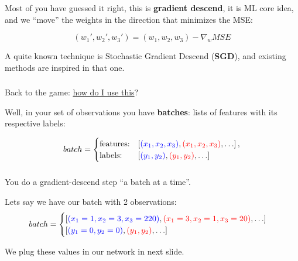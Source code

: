 \documentclass{beamer}
\begin{document}
\begin{frame}
    \frametitle{\insertsection}
    \framesubtitle{\insertsubsection}

    Most of you have guessed it right, this is \textbf{gradient descend}, it is ML core idea, and we ``move'' the weights in the direction that minimizes the MSE:

    \begin{equation}
        (w_1',w_2',w_3') = (w_1,w_2,w_3) - \nabla_w MSE
    \end{equation}

    \vfill
    A quite known technique is Stochastic Gradient Descend (\textbf{SGD}), and existing methods are inspired in that one.
\end{frame}



\begin{frame}
    \frametitle{\insertsection}
    \framesubtitle{\insertsubsection}

    Back to the game: \underline{how do I use this}?
    \vfill

    Well, in your set of observations you have \textbf{batches}: lists of features with its respective labels:

    \begin{equation*}
        batch=\begin{cases}
            \text{features:} & \left[ {\color{blue}(x_1,x_2,x_3)}, {\color{red}(x_1,x_2,x_3)},\ldots \right],\\
            \text{labels:} & \left[ {\color{blue}(y_1,y_2)}, {\color{red}(y_1,y_2)},\ldots \right]
        \end{cases}
    \end{equation*}
\end{frame}


\begin{frame}
    \frametitle{\insertsection}
    \framesubtitle{\insertsubsection}

    You do a gradient-descend step ``a batch at a time''.

    Lets say we have our batch with 2 observations:
    \begin{equation*}
        batch=\begin{cases}
            \left[ {\color{blue}(x_1=1,x_2=3,x_3=220)}, {\color{red}(x_1=3,x_2=1,x_3=20)},\ldots \right]\\
            \left[ {\color{blue}(y_1=0,y_2=0)}, {\color{red}(y_1,y_2)},\ldots \right]
        \end{cases}
    \end{equation*}

    We plug these values in our network in next slide.
\end{frame}
\end{document}
